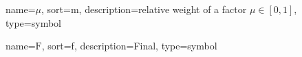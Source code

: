 	{%
		name=\ensuremath{\mu},
		sort=m,
		description=relative weight of a factor \ensuremath{\mu \in [0, 1]},
		type=symbol
	}
	\newcommand{\relweight}{\gls{sym:relweight}}

	{%
		name={\ensuremath{\mathrm{F}}},
		sort=f,
		description=Final,
		type=symbol
	}
	\newcommand{\final}{\gls{sym:final}}
